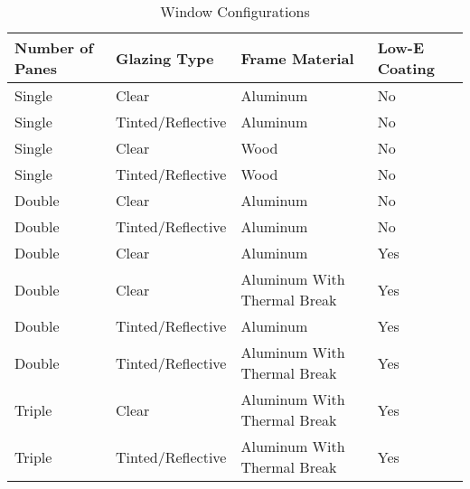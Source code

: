\begin{table}
\centering
\caption[Window Configurations]{Window Configurations}
\label{tab:window_configurations}
\begin{tabular}{|l|l|l|l|}
\hline
\textbf{Number of Panes} & \textbf{Glazing Type} & \textbf{Frame Material} & \textbf{Low-E Coating} \\ \hline
Single          & Clear             & Aluminum                    & No            \\ \hline
Single          & Tinted/Reflective & Aluminum                    & No            \\ \hline
Single          & Clear             & Wood                        & No            \\ \hline
Single          & Tinted/Reflective & Wood                        & No            \\ \hline
Double          & Clear             & Aluminum                    & No            \\ \hline
Double          & Tinted/Reflective & Aluminum                    & No            \\ \hline
Double          & Clear             & Aluminum                    & Yes           \\ \hline
Double          & Clear             & Aluminum With Thermal Break & Yes           \\ \hline
Double          & Tinted/Reflective & Aluminum                    & Yes           \\ \hline
Double          & Tinted/Reflective & Aluminum With Thermal Break & Yes           \\ \hline
Triple          & Clear             & Aluminum With Thermal Break & Yes           \\ \hline
Triple          & Tinted/Reflective & Aluminum With Thermal Break & Yes           \\ \hline
\end{tabular}
\end{table}